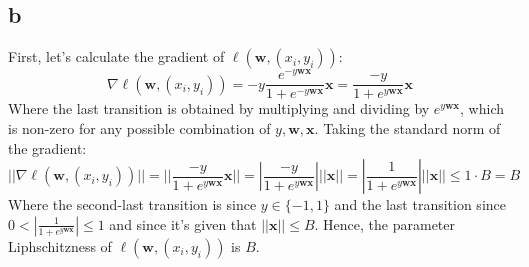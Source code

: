 \subsection*{b}
First, let's calculate the gradient of $\ell\left(\pmb{w}, (x_i, y_i)\right)$:
\begin{equation*}
    \nabla \ell\left(\pmb{w}, (x_i, y_i)\right) = -y \frac{e^{-y \pmb{w} \pmb{x}}}{1+e^{-y \pmb{w} \pmb{x}}} \pmb{x}
    = \frac{-y}{1+e^{y \pmb{w} \pmb{x}}} \pmb{x}
\end{equation*}
Where the last transition is obtained by multiplying and dividing by $e^{y \pmb{w} \pmb{x}}$, which is non-zero for any possible combination of $y, \pmb{w},\pmb{x}$. Taking the standard norm of the gradient:
\begin{equation*}
    ||\nabla \ell\left(\pmb{w}, (x_i, y_i)\right)|| = ||\frac{-y}{1+e^{y \pmb{w} \pmb{x}}} \pmb{x}|| = |\frac{-y}{1+e^{y \pmb{w} \pmb{x}}}| ||\pmb{x}|| = |\frac{1}{1+e^{y \pmb{w} \pmb{x}}}| ||\pmb{x}|| \leq 1 \cdot B = B
\end{equation*}
Where the second-last transition is since $y \in \{-1, 1\}$ and the last transition since $0<|\frac{1}{1+e^{y \pmb{w} \pmb{x}}}| \leq 1$ and since it's given that $||\pmb{x}|| \leq B$. Hence, the parameter Liphschitzness of $\ell\left(\pmb{w}, (x_i, y_i)\right)$ is $B$.


